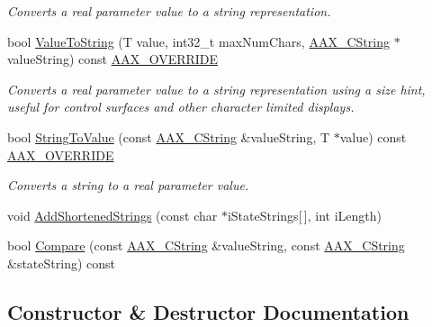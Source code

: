 \begin{DoxyCompactItemize}
\begin{DoxyCompactList}\small\item\em Converts a real parameter value to a string representation. \end{DoxyCompactList}\item 
bool \mbox{\hyperlink{a01561_aa215047157510512cba129c41c8fc191}{Value\+To\+String}} (T value, int32\+\_\+t max\+Num\+Chars, \mbox{\hyperlink{a01573}{A\+A\+X\+\_\+\+C\+String}} $\ast$value\+String) const \mbox{\hyperlink{a00392_ac2f24a5172689ae684344abdcce55463}{A\+A\+X\+\_\+\+O\+V\+E\+R\+R\+I\+DE}}
\begin{DoxyCompactList}\small\item\em Converts a real parameter value to a string representation using a size hint, useful for control surfaces and other character limited displays. \end{DoxyCompactList}\item 
bool \mbox{\hyperlink{a01561_a88ad0da8c178688d38134cef85ab37b2}{String\+To\+Value}} (const \mbox{\hyperlink{a01573}{A\+A\+X\+\_\+\+C\+String}} \&value\+String, T $\ast$value) const \mbox{\hyperlink{a00392_ac2f24a5172689ae684344abdcce55463}{A\+A\+X\+\_\+\+O\+V\+E\+R\+R\+I\+DE}}
\begin{DoxyCompactList}\small\item\em Converts a string to a real parameter value. \end{DoxyCompactList}\item 
void \mbox{\hyperlink{a01561_a64620c0927e54df1cb2881039b71b34e}{Add\+Shortened\+Strings}} (const char $\ast$i\+State\+Strings\mbox{[}$\,$\mbox{]}, int i\+Length)
\item 
bool \mbox{\hyperlink{a01561_a945f045fc8348325ed05abcf75b85456}{Compare}} (const \mbox{\hyperlink{a01573}{A\+A\+X\+\_\+\+C\+String}} \&value\+String, const \mbox{\hyperlink{a01573}{A\+A\+X\+\_\+\+C\+String}} \&state\+String) const
\end{DoxyCompactItemize}


\subsection{Constructor \& Destructor Documentation}
\mbox{\label{a01561_a307685fc5172fec5ccfba138f9f4c8ec}} 
